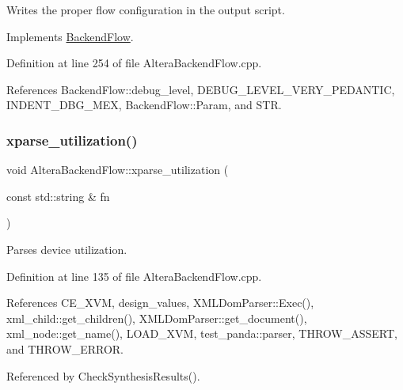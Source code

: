 Writes the proper flow configuration in the output script. 



Implements \hyperlink{classBackendFlow_acd93b1846b958eb6b7e10b9894bf5615}{Backend\+Flow}.



Definition at line 254 of file Altera\+Backend\+Flow.\+cpp.



References Backend\+Flow\+::debug\+\_\+level, D\+E\+B\+U\+G\+\_\+\+L\+E\+V\+E\+L\+\_\+\+V\+E\+R\+Y\+\_\+\+P\+E\+D\+A\+N\+T\+IC, I\+N\+D\+E\+N\+T\+\_\+\+D\+B\+G\+\_\+\+M\+EX, Backend\+Flow\+::\+Param, and S\+TR.

\mbox{\label{classAlteraBackendFlow_ac566361f8b25433c52b90ec30b100d35}} 
\subsubsection{\texorpdfstring{xparse\+\_\+utilization()}{xparse\_utilization()}}
{\footnotesize\ttfamily void Altera\+Backend\+Flow\+::xparse\+\_\+utilization (\begin{DoxyParamCaption}\item[{const std\+::string \&}]{fn }\end{DoxyParamCaption})\hspace{0.3cm}{\ttfamily [private]}}



Parses device utilization. 



Definition at line 135 of file Altera\+Backend\+Flow.\+cpp.



References C\+E\+\_\+\+X\+VM, design\+\_\+values, X\+M\+L\+Dom\+Parser\+::\+Exec(), xml\+\_\+child\+::get\+\_\+children(), X\+M\+L\+Dom\+Parser\+::get\+\_\+document(), xml\+\_\+node\+::get\+\_\+name(), L\+O\+A\+D\+\_\+\+X\+VM, test\+\_\+panda\+::parser, T\+H\+R\+O\+W\+\_\+\+A\+S\+S\+E\+RT, and T\+H\+R\+O\+W\+\_\+\+E\+R\+R\+OR.



Referenced by Check\+Synthesis\+Results().

